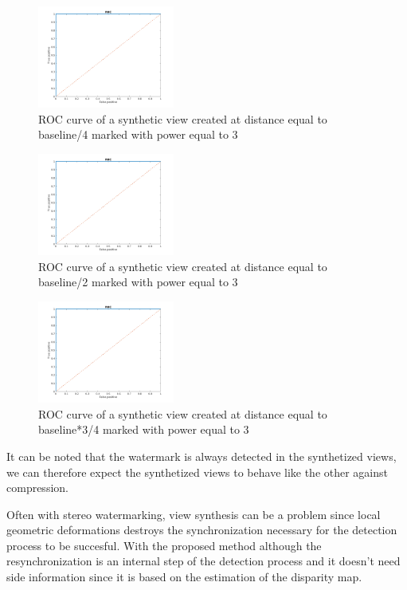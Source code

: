 \begin{figure}[h!]
\centering
\includegraphics[width=0.4\textwidth]{./img/ROC/ROC_gauss_synt_3_25.png}
\caption{\small{ROC curve of a synthetic view created at distance equal to baseline/4 marked with power equal to 3 }}
\label{fig:g3vs25}
\end{figure}
\begin{figure}[h!]
\centering
\includegraphics[width=0.4\textwidth]{./img/ROC/ROC_gauss_synt_3_50.png}
\caption{\small{ROC curve of a synthetic view created at distance equal to baseline/2 marked with power equal to 3 }}
\label{fig:g3vs50}
\end{figure}
\begin{figure}[h!]
\centering
\includegraphics[width=0.4\textwidth]{./img/ROC/ROC_gauss_synt_3_75.png}
\caption{\small{ROC curve of a synthetic view created at distance equal to baseline*3/4 marked with power equal to 3 }}
\label{fig:g3vs75}
\end{figure}
\clearpage
It can be noted that the watermark is always detected in the synthetized views, we can therefore expect the synthetized views to behave like the other against compression.\newline

Often with stereo watermarking, view synthesis can be a problem since local geometric deformations destroys the synchronization necessary for the detection process to be succesful. With the proposed method although the resynchronization is an internal step of the detection process and it doesn't need side information since it is based on the estimation of the disparity map.

